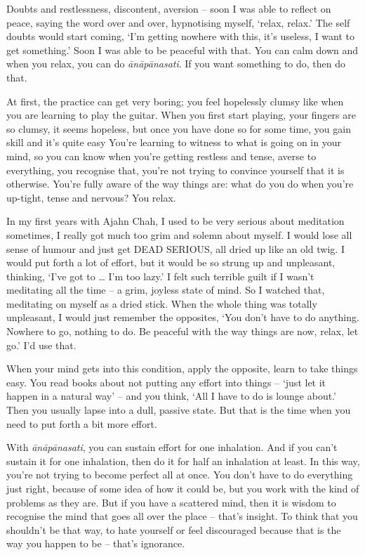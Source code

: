Doubts and restlessness, discontent, aversion -- soon I was able to reflect on peace, saying the word over and over, hypnotising myself, `relax, relax.' The self doubts would start coming, `I'm getting nowhere with this, it's useless, I want to get something.' Soon I was able to be peaceful with that. You can calm down and when you relax, you can do \textit{\=an\=ap\=anasati}. If you want something to do, then do that.

At first, the practice can get very boring; you feel hopelessly clumsy like when you are learning to play the guitar. When you first start playing, your fingers are so clumsy, it seems hopeless, but once you have done so for some time, you gain skill and it's quite easy You're learning to witness to what is going on in your mind, so you can know when you're getting restless and tense, averse to everything, you recognise that, you're not trying to convince yourself that it is otherwise. You're fully aware of the way things are: what do you do when you're up-tight, tense and nervous? You relax.

In my first years with Ajahn Chah, I used to be very serious about meditation sometimes, I really got much too grim and solemn about myself. I would lose all sense of humour and just get DEAD SERIOUS, all dried up like an old twig. I would put forth a lot of effort, but it would be so strung up and unpleasant, thinking, `I've got to \ldots{} I'm too lazy.' I felt such terrible guilt if I wasn't meditating all the time -- a grim, joyless state of mind. So I watched that, meditating on myself as a dried stick. When the whole thing was totally unpleasant, I would just remember the opposites, `You don't have to do anything. Nowhere to go, nothing to do. Be peaceful with the way things are now, relax, let go.' I'd use that.

When your mind gets into this condition, apply the opposite, learn to take things easy. You read books about not putting any effort into things -- `just let it happen in a natural way' -- and you think, `All I have to do is lounge about.' Then you usually lapse into a dull, passive state. But that is the time when you need to put forth a bit more effort.

With \textit{\=an\=ap\=anasati}, you can sustain effort for one inhalation. And if you can't sustain it for one inhalation, then do it for half an inhalation at least. In this way, you're not trying to become perfect all at once. You don't have to do everything just right, because of some idea of how it could be, but you work with the kind of problems as they are. But if you have a scattered mind, then it is wisdom to recognise the mind that goes all over the place -- that's insight. To think that you shouldn't be that way, to hate yourself or feel discouraged because that is the way you happen to be -- that's ignorance.

